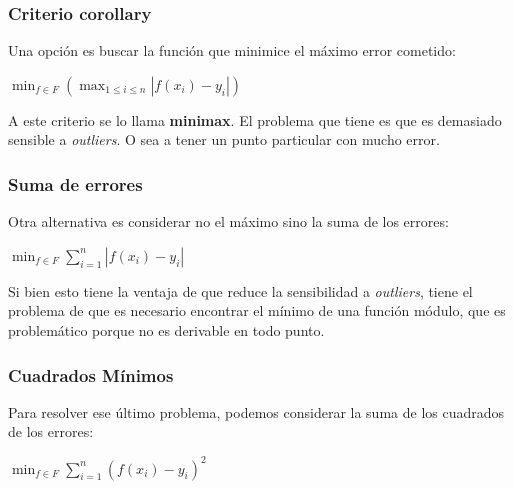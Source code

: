 \documentclass[]{article}
\begin{document}
\subsubsection{Criterio corollary}
Una opción es buscar la función que minimice el máximo error cometido:
\begin{center}
	$\displaystyle \min_{f\in F} \left(\max_{1\leq i \leq n} |f(x_i) -y_i|\right)$
\end{center}

A este criterio se lo llama \textbf{minimax}. El problema que tiene es que es demasiado sensible a \emph{outliers}. O sea a tener un punto particular con mucho error.

\subsubsection{Suma de errores}
Otra alternativa es considerar no el máximo sino la suma de los errores:
\begin{center}
	$\displaystyle \min_{f\in F} \sum_{i=1}^{n}|f(x_i)-y_i|$
\end{center}

Si bien esto tiene la ventaja de que reduce la sensibilidad a \emph{outliers}, tiene el problema de que es necesario encontrar el mínimo de una función módulo, que es problemático porque no es derivable en todo punto.

\subsubsection{Cuadrados Mínimos}
Para resolver ese último problema, podemos considerar la suma de los cuadrados de los errores:
\begin{center}
	$\displaystyle \min_{f\in F} \sum_{i=1}^{n}(f(x_i)-y_i)^2$
\end{center}
\end{document}
